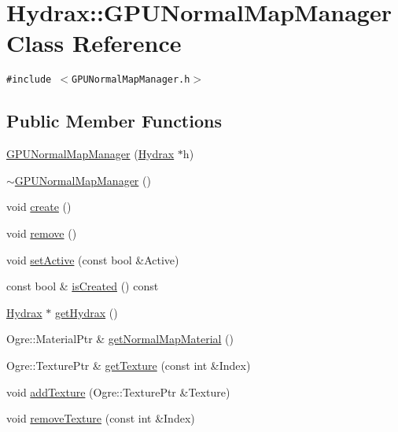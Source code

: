 \hypertarget{class_hydrax_1_1_g_p_u_normal_map_manager}{
\section{Hydrax::GPUNormalMapManager Class Reference}
\label{class_hydrax_1_1_g_p_u_normal_map_manager}
}
{\tt \#include $<$GPUNormalMapManager.h$>$}

\subsection*{Public Member Functions}
\begin{CompactItemize}
\item 
\hyperlink{class_hydrax_1_1_g_p_u_normal_map_manager_9c2a79cec8c9a72e2916587e09c9c83f}{GPUNormalMapManager} (\hyperlink{class_hydrax_1_1_hydrax}{Hydrax} $\ast$h)
\item 
\hyperlink{class_hydrax_1_1_g_p_u_normal_map_manager_00de9b3c181b8b91e1a8448f4e70976c}{$\sim$GPUNormalMapManager} ()
\item 
void \hyperlink{class_hydrax_1_1_g_p_u_normal_map_manager_7398a504e11ea902839868d69bcf956b}{create} ()
\item 
void \hyperlink{class_hydrax_1_1_g_p_u_normal_map_manager_3a9a24e5832aaa24f78025d1ba04f8a3}{remove} ()
\item 
void \hyperlink{class_hydrax_1_1_g_p_u_normal_map_manager_c58c786ad6359d8f70b5ecd0bc30464b}{setActive} (const bool \&Active)
\item 
const bool \& \hyperlink{class_hydrax_1_1_g_p_u_normal_map_manager_08b3f31fd1b4be43a6f0cc8ac0063077}{isCreated} () const 
\item 
\hyperlink{class_hydrax_1_1_hydrax}{Hydrax} $\ast$ \hyperlink{class_hydrax_1_1_g_p_u_normal_map_manager_8252b201663431e9760cf1e9586afc81}{getHydrax} ()
\item 
Ogre::MaterialPtr \& \hyperlink{class_hydrax_1_1_g_p_u_normal_map_manager_03dbe50e39daea6c40ac192c0afa1936}{getNormalMapMaterial} ()
\item 
Ogre::TexturePtr \& \hyperlink{class_hydrax_1_1_g_p_u_normal_map_manager_b37c3778df109d139c6136fbda3abe80}{getTexture} (const int \&Index)
\item 
void \hyperlink{class_hydrax_1_1_g_p_u_normal_map_manager_6f1b8618e5a860bbd1300c5beedf1194}{addTexture} (Ogre::TexturePtr \&Texture)
\item 
void \hyperlink{class_hydrax_1_1_g_p_u_normal_map_manager_134fe8bf7ebfbcf75e3a7953a5beb028}{removeTexture} (const int \&Index)
\end{CompactItemize}


